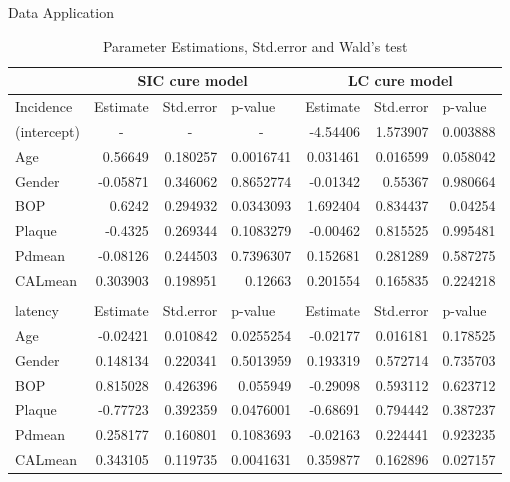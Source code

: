 \documentclass[10 pt]{beamer}
\newcommand{\RedText} {\textcolor[rgb]{1,0,0}}
\begin{document}
\begin{frame}{Data Application}
\begin{table}[htbp]
	\centering
	\caption{Parameter Estimations, Std.error and Wald's test}
	\small
	\begin{tabular}{lrrrrrr}
		\hline
		& \multicolumn{3}{c}{SIC cure model} & \multicolumn{3}{c}{LC cure model} \\
		\hline
		Incidence & \multicolumn{1}{l}{Estimate} & \multicolumn{1}{l}{Std.error} & \multicolumn{1}{l}{p-value} & \multicolumn{1}{l}{Estimate} & \multicolumn{1}{l}{Std.error} & \multicolumn{1}{l}{p-value} \\
		\hline
		(intercept) & \multicolumn{1}{c}{-} & \multicolumn{1}{c}{-} & \multicolumn{1}{c}{-} & -4.54406 & 1.573907 & 0.003888 \\
		Age     & 0.56649 & 0.180257 & \RedText{0.0016741} & 0.031461 & 0.016599 & \RedText{0.058042} \\
		Gender  & -0.05871 & 0.346062 & 0.8652774 & -0.01342 & 0.55367 & 0.980664 \\
		BOP     & 0.6242  & 0.294932 & \RedText{0.0343093} & 1.692404 & 0.834437 & \RedText{0.04254} \\
		Plaque  & -0.4325 & 0.269344 & 0.1083279 & -0.00462 & 0.815525 & 0.995481 \\
		Pdmean  & -0.08126 & 0.244503 & 0.7396307 & 0.152681 & 0.281289 & 0.587275 \\
		CALmean & 0.303903 & 0.198951 & 0.12663 & 0.201554 & 0.165835 & 0.224218 \\
		&         &         &         &         &         &  \\
		\hline
		latency & \multicolumn{1}{l}{Estimate} & \multicolumn{1}{l}{Std.error} &
		 \multicolumn{1}{l}{p-value} & \multicolumn{1}{l}{Estimate} & \multicolumn{1}{l}{Std.error} & \multicolumn{1}{l}{p-value} \\
		 \hline
		Age     & -0.02421 & 0.010842 & \RedText{0.0255254} & -0.02177 & 0.016181 & 0.178525 \\
		Gender  & 0.148134 & 0.220341 & 0.5013959 & 0.193319 & 0.572714 & 0.735703 \\
		BOP     & 0.815028 & 0.426396 & 0.055949 & -0.29098 & 0.593112 & 0.623712 \\
		Plaque  & -0.77723 & 0.392359 & 0.0476001 & -0.68691 & 0.794442 & 0.387237 \\
		Pdmean  & 0.258177 & 0.160801 & 0.1083693 & -0.02163 & 0.224441 & 0.923235 \\
		CALmean & 0.343105 & 0.119735 & \RedText{0.0041631} & 0.359877 & 0.162896 & \RedText{0.027157} \\
		\hline
	\end{tabular}%
	\label{tab:addlabel}%
\end{table}%
\end{frame}
\end{document}
